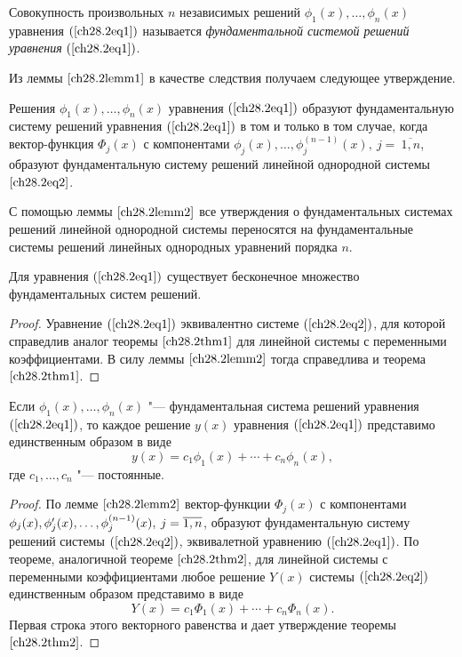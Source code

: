 \begin{defn}
Совокупность произвольных $n$ независимых решений $\phi_1(x), \ldots, \phi_n(x)$ уравнения $(\ref{ch28.2eq1})$ называется \textit{фундаментальной системой решений уравнения} $(\ref{ch28.2eq1})$.
\end{defn}

Из леммы $\ref{ch28.2lemm1}$ в качестве следствия получаем следующее утверждение.

\begin{lemm} \label{ch28.2lemm2}
Решения $\phi_1(x), \ldots, \phi_n(x)$ уравнения $(\ref{ch28.2eq1})$ образуют фундаментальную систему решений уравнения $(\ref{ch28.2eq1})$ в том и только в том случае, когда вектор-функция $\Phi_j(x)$ с компонентами $\phi_j(x), \ldots, \phi^{(n - 1)}_j(x),\ j =\ \overline{1,n}$, образуют фундаментальную систему решений линейной однородной системы $\eqref{ch28.2eq2}$.
\end{lemm}

С помощью леммы $\ref{ch28.2lemm2}$ все утверждения о фундаментальных системах решений линейной однородной системы переносятся на фундаментальные системы решений линейных однородных уравнений порядка $n$.

\begin{thm} \label{ch28.2thm1}
Для уравнения $(\ref{ch28.2eq1})$ существует бесконечное множество фундаментальных систем решений.
\end{thm}

\begin{proof}
Уравнение $(\ref{ch28.2eq1})$ эквивалентно системе $(\ref{ch28.2eq2})$, для которой справедлив аналог теоремы $\ref{ch28.2thm1}$ для линейной системы с переменными коэффициентами. В силу леммы $\ref{ch28.2lemm2}$ тогда справедлива и теорема $\ref{ch28.2thm1}$.
\end{proof}

\begin{thm} \label{ch28.2thm2}
Если $\phi_1(x), \ldots, \phi_n(x)$ "--- фундаментальная система решений уравнения $(\ref{ch28.2eq1})$, то каждое решение $y(x)$ уравнения $(\ref{ch28.2eq1})$ представимо единственным образом в виде
$$
y(x) = c_1\phi_1(x) + \cdots + c_n\phi_n(x),
$$
где $c_1, \ldots, c_n$ "--- постоянные.
\end{thm}

\begin{proof}
По лемме $\ref{ch28.2lemm2}$ вектор-функции $\Phi_j(x)$ с компонентами $\phi_j(x),\\ \phi'_j(x), \ldots, \phi^{(n - 1)}_j(x), \: j = \overline{1,n}$, образуют фундаментальную систему решений системы $(\ref{ch28.2eq2})$, эквивалетной уравнению $(\ref{ch28.2eq1})$. По теореме, аналогичной теореме $\ref{ch28.2thm2}$, для линейной системы с переменными коэффициентами любое решение $Y(x)$ системы $(\ref{ch28.2eq2})$ единственным образом представимо в виде
$$
Y(x) = c_1 \Phi_1(x) + \cdots + c_n \Phi_n(x).
$$
Первая строка этого векторного равенства и дает утверждение теоремы~$\ref{ch28.2thm2}$.
\end{proof}

